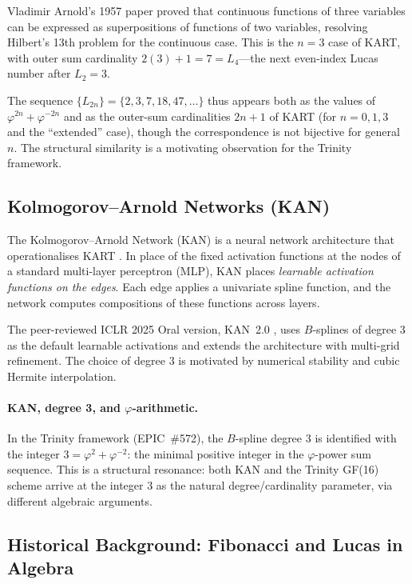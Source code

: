 Vladimir Arnold's 1957 paper \cite{arnold_kar_1957} proved that
continuous functions of three variables can be expressed as
superpositions of functions of two variables, resolving Hilbert's
13th problem for the continuous case.
This is the $n=3$ case of KART, with outer sum cardinality
$2(3)+1=7 = L_{4}$---the next even-index Lucas number after $L_{2}=3$.

The sequence $\{L_{2n}\} = \{2, 3, 7, 18, 47, \ldots\}$ thus
appears both as the values of $\varphi^{2n}+\varphi^{-2n}$ and
as the outer-sum cardinalities $2n+1$ of KART (for $n=0,1,3$
and the ``extended'' case), though the correspondence is
not bijective for general $n$.
The structural similarity is a motivating observation for the
Trinity framework.

\subsection{Kolmogorov--Arnold Networks (KAN)}

The Kolmogorov--Arnold Network (KAN) is a neural network architecture
that operationalises KART \cite{liu_kan2_2025}.
In place of the fixed activation functions at the nodes of a
standard multi-layer perceptron (MLP), KAN places \emph{learnable
activation functions on the edges}.
Each edge applies a univariate spline function, and the network
computes compositions of these functions across layers.

The peer-reviewed ICLR 2025 Oral version, KAN~2.0 \cite{liu_kan2_2025},
uses $B$-splines of degree $3$ as the default learnable activations
and extends the architecture with multi-grid refinement.
The choice of degree $3$ is motivated by numerical stability and
cubic Hermite interpolation.

\paragraph{KAN, degree 3, and $\varphi$-arithmetic.}
In the Trinity framework (EPIC~\#572), the $B$-spline degree $3$
is identified with the integer $3 = \varphi^{2}+\varphi^{-2}$:
the minimal positive integer in the $\varphi$-power sum sequence.
This is a structural resonance: both KAN and the Trinity GF(16)
scheme arrive at the integer $3$ as the natural degree/cardinality
parameter, via different algebraic arguments.

\subsection{Historical Background: Fibonacci and Lucas in Algebra}


